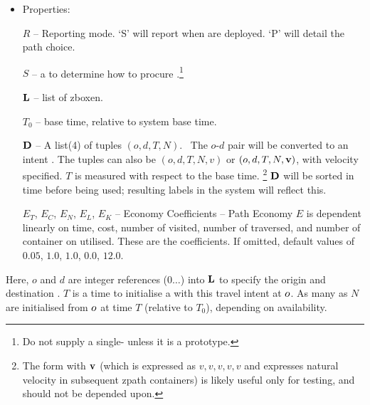 \begin{itemize}
\item Properties:

  $R$ -- Reporting mode. `S' will report when  are deployed. `P' will detail the path choice. 

  
  $S$ -- a  to determine how to procure .\footnote{Do not supply a single-  unless it is a prototype.}
  
  ${\bf L}$ -- list of zboxen.
  
  $T_0$ -- base time, relative to system base time.

  ${\bf D}$ -- A list(4) of tuples $(o,d,T,N)$. \
  The $o$-$d$ pair will be converted to an intent .
  The tuples can also be $(o,d,T,N,v)$ or $(o,d,T,N,{\bf v})$, with  velocity specified.
  $T$ is measured with respect to the base time.
  \footnote{The form with ${\bf v}$ (which is expressed as $v,v,v,v,v$
    and expresses natural velocity in subsequent zpath containers) is
    likely useful only for testing, and should not be depended upon.}
  ${\bf D}$ will be sorted in time before being used; resulting labels in the system will reflect this.
  
  $E_T$, $E_C$, $E_N$, $E_L$, $E_K$ -- Economy Coefficients -- Path
  Economy $E$ is dependent linearly on time, cost, number of
   visited, number of  traversed, and number
  of container \zobj{zboxen} on \zobj{zpaths} utilised. These are the
  coefficients. If omitted, default values of $0.05$, $1.0$, $1.0$,
  $0.0$, $12.0$.



  
\end{itemize}
Here, $o$ and $d$ are integer references ($0\dots$) into ${\bf L}$ to specify the
origin and destination .
$T$ is a time to initialise a  with this travel intent at ${o}$.
As many as $N$ \zobj{zboxen} are initialised from ${o}$ at time $T$ (relative to $T_0$), depending on availability.

